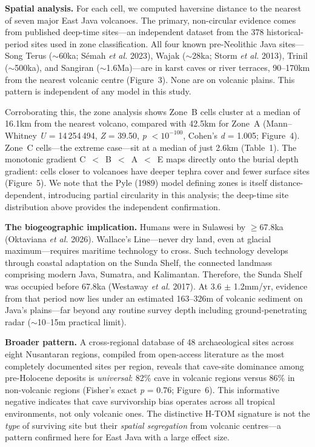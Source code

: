 \documentclass[12pt]{article}
\begin{document}
\textbf{Spatial analysis.}
For each cell, we computed haversine distance to the nearest of seven major East Java volcanoes.
The primary, non-circular evidence comes from published deep-time sites---an independent dataset from the 378 historical-period sites used in zone classification. All four known pre-Neolithic Java sites---Song Terus ($\sim$60ka; S\'{e}mah \textit{et al.} 2023), Wajak ($\sim$28ka; Storm \textit{et al.} 2013), Trinil ($\sim$500ka), and Sangiran ($\sim$1.6Ma)---are in karst caves or river terraces, 90--170km from the nearest volcanic centre (Figure~3).
None are on volcanic plains.
This pattern is independent of any model in this study.

Corroborating this, the zone analysis shows Zone~B cells cluster at a median of 16.1km from the nearest volcano, compared with 42.5km for Zone~A (Mann--Whitney \textit{U} = 14\,254\,494, \textit{Z} = 39.50, \textit{p} $< 10^{-100}$, Cohen's \textit{d} = 1.005; Figure~4).
Zone~C cells---the extreme case---sit at a median of just 2.6km (Table~1).
The monotonic gradient C~$<$~B~$<$~A~$<$~E maps directly onto the burial depth gradient: cells closer to volcanoes have deeper tephra cover and fewer surface sites (Figure~5).
We note that the Pyle (1989) model defining zones is itself distance-dependent, introducing partial circularity in this analysis; the deep-time site distribution above provides the independent confirmation.

\textbf{The biogeographic implication.}
Humans were in Sulawesi by $\geq$67.8ka (Oktaviana \textit{et al.} 2026).
Wallace's Line---never dry land, even at glacial maximum---requires maritime technology to cross.
Such technology develops through coastal adaptation on the Sunda Shelf, the connected landmass comprising modern Java, Sumatra, and Kalimantan.
Therefore, the Sunda Shelf was occupied before 67.8ka (Westaway \textit{et al.} 2017).
At 3.6 $\pm$ 1.2mm/yr, evidence from that period now lies under an estimated 163--326m of volcanic sediment on Java's plains---far beyond any routine survey depth including ground-penetrating radar ($\sim$10--15m practical limit).

\textbf{Broader pattern.}
A cross-regional database of 48 archaeological sites across eight Nusantaran regions, compiled from open-access literature as the most completely documented sites per region, reveals that cave-site dominance among pre-Holocene deposits is \textit{universal}: 82\% cave in volcanic regions versus 86\% in non-volcanic regions (Fisher's exact \textit{p} = 0.76; Figure~6).
This informative negative indicates that cave survivorship bias operates across all tropical environments, not only volcanic ones.
The distinctive H-TOM signature is not the \textit{type} of surviving site but their \textit{spatial segregation} from volcanic centres---a pattern confirmed here for East Java with a large effect size.
\end{document}
